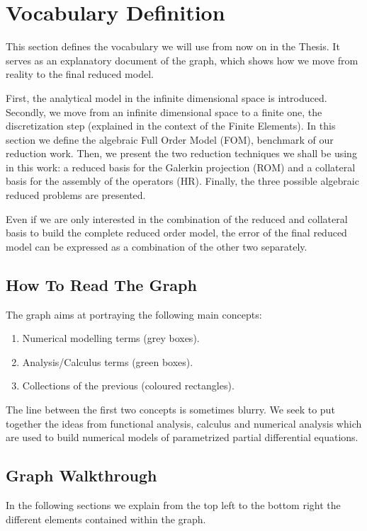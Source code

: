 \documentclass[../main.tex]{subfiles}
\begin{document}
    
\section{Vocabulary Definition}

This section defines the vocabulary we will use from now on in the Thesis. It serves as an explanatory document of the graph, which shows how we move from reality to the final reduced model. 

First, the analytical model in the infinite dimensional space is introduced. 
Secondly, we move from an infinite dimensional space to a finite one, the discretization step (explained in the context of the Finite Elements).
In this section we define the algebraic Full Order Model (FOM), benchmark of our reduction work. 
Then, we present the two reduction techniques we shall be using in this work: a reduced basis for the Galerkin projection (ROM) and a collateral basis for the assembly of the operators (HR). 
Finally, the three possible algebraic reduced problems are presented. 

Even if we are only interested in the combination of the reduced and collateral basis to build the complete reduced order model, the error of the final reduced model can be expressed as a combination of the other two separately. 

\subsection{How To Read The Graph}
The graph aims at portraying the following main concepts:
\begin{enumerate}
    \item Numerical modelling terms (grey boxes).
    \item Analysis/Calculus terms (green boxes).
    \item Collections of the previous (coloured rectangles).
\end{enumerate}
The line between the first two concepts is sometimes blurry. 
We seek to put together the ideas from functional analysis, calculus and numerical analysis which are used to build numerical models of parametrized partial differential equations.

\subsection{Graph Walkthrough}
In the following sections we explain from the top left to the bottom right the different elements contained within the graph. 
\end{document}
